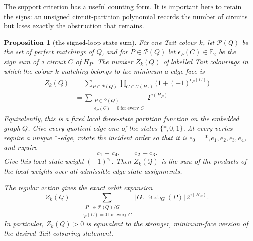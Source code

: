\documentclass[11pt,a4paper]{article}
\newtheorem{proposition}[theorem]{Proposition}
\theoremstyle{definition}
\theoremstyle{remark}
\begin{document}
The support criterion has a useful counting form.  It is important here to retain the signs: an unsigned circuit-partition polynomial records the number of circuits but loses exactly the obstruction that remains.
\begin{proposition}[the signed-loop state sum]\label{prop:signed-loop-sum}
Fix one Tait colour $k$, let $\mathcal P(Q)$ be the set of perfect matchings of $Q$, and for $P\in\mathcal P(Q)$ let $\epsilon_P(C)\in\mathbb F_2$ be the sign sum of a circuit $C$ of $H_P$.  The number $Z_k(Q)$ of labelled Tait colourings in which the colour-$k$ matching belongs to the minimum-$a$-edge face is
\begin{equation}\label{eq:signed-loop-sum}
 \begin{split}
 Z_k(Q)
 &=\sum_{P\in\mathcal P(Q)}
       \prod_{C\in\mathcal C(H_P)}
       \bigl(1+(-1)^{\epsilon_P(C)}\bigr)\\
 &=\sum_{\substack{P\in\mathcal P(Q)\\
                    \epsilon_P(C)=0\ \text{for every }C}}
       2^{c(H_P)}.
 \end{split}
\end{equation}
Equivalently, this is a fixed local three-state partition function on the embedded graph $Q$.  Give every quotient edge one of the states $\{\ast,0,1\}$.  At every vertex require a unique $\ast$-edge, rotate the incident order so that it is
$e_0=\ast,e_1,e_2,e_3,e_4$, and require
\[
 e_1=e_4,\qquad e_2=e_3.
\]
Give this local state weight $(-1)^{e_1}$.  Then $Z_k(Q)$ is the sum of the products of the local weights over all admissible edge-state assignments.

The regular action gives the exact orbit expansion
\begin{equation}\label{eq:signed-loop-orbits}
 Z_k(Q)=
 \sum_{\substack{[P]\in\mathcal P(Q)/G\\
                   \epsilon_P(C)=0\ \text{for every }C}}
 |G:\operatorname{Stab}_G(P)|\,2^{c(H_P)}.
\end{equation}
In particular, $Z_k(Q)>0$ is equivalent to the stronger, minimum-face version of the desired Tait-colouring statement.
\end{proposition}
\end{document}
